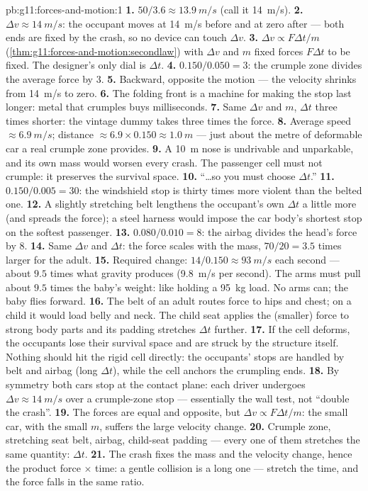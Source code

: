 \begin{solution}{pb:g11:forces-and-motion:1}
\textbf{1.} $50/3.6 \approx \qty{13.9}{m/s}$ (call it \qty{14}{m/s}).
\textbf{2.} $\Delta v \approx \qty{14}{m/s}$: the occupant moves at
\qty{14}{m/s} before and at zero after --- both ends are fixed by the
crash, so no device can touch $\Delta v$.
\textbf{3.} $\Delta v \propto F\Delta t/m$
(\cref{thm:g11:forces-and-motion:secondlaw}) with $\Delta v$ and $m$
fixed forces $F\Delta t$ to be fixed. The designer's only dial is
$\Delta t$.
\textbf{4.} $0.150/0.050 = 3$: the crumple zone divides the average
force by $3$.
\textbf{5.} Backward, opposite the motion --- the velocity shrinks from
\qty{14}{m/s} to zero.
\textbf{6.} The folding front is a machine for making the stop last
longer: metal that crumples buys milliseconds.
\textbf{7.} Same $\Delta v$ and $m$, $\Delta t$ three times shorter:
the vintage dummy takes three times the force.
\textbf{8.} Average speed $\approx \qty{6.9}{m/s}$; distance $\approx
6.9 \times 0.150 \approx \qty{1.0}{m}$ --- just about the metre of
deformable car a real crumple zone provides.
\textbf{9.} A \qty{10}{m} nose is undrivable and unparkable, and its
own mass would worsen every crash. The passenger cell must not
crumple: it preserves the survival space.
\textbf{10.} ``\dots so you must choose $\Delta t$.''
\textbf{11.} $0.150/0.005 = 30$: the windshield stop is thirty times
more violent than the belted one.
\textbf{12.} A slightly stretching belt lengthens the occupant's own
$\Delta t$ a little more (and spreads the force); a steel harness
would impose the car body's shortest stop on the softest passenger.
\textbf{13.} $0.080/0.010 = 8$: the airbag divides the head's force by
$8$.
\textbf{14.} Same $\Delta v$ and $\Delta t$: the force scales with the
mass, $70/20 = 3.5$ times larger for the adult.
\textbf{15.} Required change: $14/0.150 \approx \qty{93}{m/s}$ each
second --- about $9.5$ times what gravity produces
(\qty{9.8}{m/s} per second). The arms must pull about $9.5$ times the
baby's weight: like holding a \qty{95}{kg} load. No arms can; the baby
flies forward.
\textbf{16.} The belt of an adult routes force to hips and chest; on a
child it would load belly and neck. The child seat applies the
(smaller) force to strong body parts and its padding stretches
$\Delta t$ further.
\textbf{17.} If the cell deforms, the occupants lose their survival
space and are struck by the structure itself. Nothing should hit the
rigid cell directly: the occupants' stops are handled by belt and
airbag (long $\Delta t$), while the cell anchors the crumpling ends.
\textbf{18.} By symmetry both cars stop at the contact plane: each
driver undergoes $\Delta v \approx \qty{14}{m/s}$ over a crumple-zone
stop --- essentially the wall test, not ``double the crash''.
\textbf{19.} The forces are equal and opposite, but
$\Delta v \propto F\Delta t/m$: the small car, with the small $m$,
suffers the large velocity change.
\textbf{20.} Crumple zone, stretching seat belt, airbag, child-seat
padding --- every one of them stretches the same quantity: $\Delta t$.
\textbf{21.} The crash fixes the mass and the velocity change, hence
the product force $\times$ time: a gentle collision is a long one ---
stretch the time, and the force falls in the same ratio.
\end{solution}
